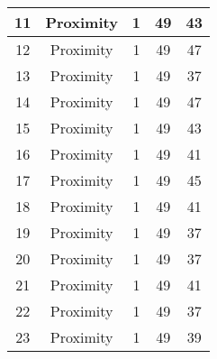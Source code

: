 \documentclass[results.tex]{subfiles}
\begin{document}
\begin{center}
\begin{tabular}{| c || c | c | c | c |}
            \hline
            11                      & Proximity                    & 1                      & 49                      & 43                   \\
            \hline
            12                      & Proximity                    & 1                      & 49                      & 47                   \\
            \hline
            13                      & Proximity                    & 1                      & 49                      & 37                   \\
            \hline
            14                      & Proximity                    & 1                      & 49                      & 47                   \\
            \hline
            15                      & Proximity                    & 1                      & 49                      & 43                   \\
            \hline
            16                      & Proximity                    & 1                      & 49                      & 41                   \\
            \hline
            17                      & Proximity                    & 1                      & 49                      & 45                   \\
            \hline
            18                      & Proximity                    & 1                      & 49                      & 41                   \\
            \hline
            19                      & Proximity                    & 1                      & 49                      & 37                   \\
            \hline
            20                      & Proximity                    & 1                      & 49                      & 37                   \\
            \hline
            21                      & Proximity                    & 1                      & 49                      & 41                   \\
            \hline
            22                      & Proximity                    & 1                      & 49                      & 37                   \\
            \hline
            23                      & Proximity                    & 1                      & 49                      & 39                   \\

\end{tabular}
\end{center}
\end{document}
